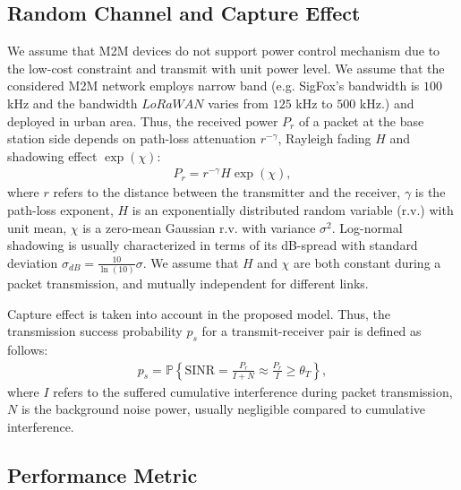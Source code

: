 \subsection{Random Channel and Capture Effect}
We assume that M2M devices do not support power control mechanism due to the low-cost constraint and transmit with unit power level. We assume that the considered M2M network employs narrow band (e.g. SigFox's bandwidth is $100$ kHz and the bandwidth $LoRaWAN$ varies from $125$ kHz to $500$ kHz.) and deployed in urban area. Thus, the received power $P_{r}$ of a packet at the base station side depends on path-loss attenuation $r^{-\gamma}$, Rayleigh fading $H$ and shadowing effect $\exp(\chi)$:
\begin{align}
\label{eq:path-loss}
P_{r} =r^{-\gamma} H \exp(\chi),
\end{align}
where $r$ refers to the distance between the transmitter and the receiver, $\gamma$ is the path-loss exponent, $H$ is an exponentially distributed random variable (r.v.) with unit mean, $\chi$ is a zero-mean Gaussian r.v. with variance $\sigma^2$. Log-normal shadowing is usually characterized in terms of its dB-spread with standard deviation $\sigma_{dB} = \frac{10}{\ln(10)}\sigma$. We assume that $H$ and $\chi$ are both constant during a packet transmission, and mutually independent for different links. 

Capture effect is taken into account in the proposed model. Thus, the transmission success probability $p_{s}$ for a transmit-receiver pair is defined as follows: 
\begin{align}
\label{eq: sinr-definition}
p_s = \mathbb{P}\left\lbrace  \text{SINR} = \frac{P_r}{I + N} \approx \frac{P_r}{I} \geq \theta_{T} \right\rbrace, 
\end{align}
where $I$ refers to the suffered cumulative interference during packet transmission, $N$ is the background noise power, usually negligible compared to cumulative interference.

\subsection{Performance Metric}

